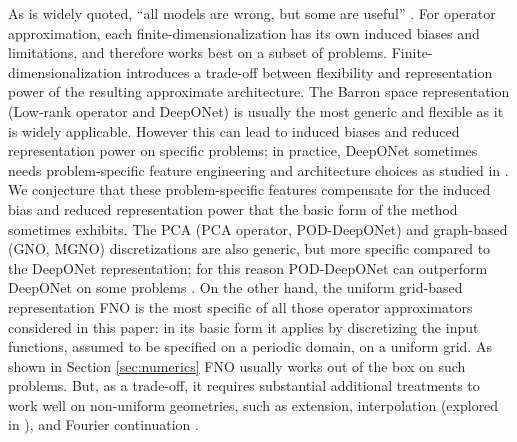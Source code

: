 As is widely quoted, ``all models are wrong, but some are useful'' \cite{box1976science}.
For operator approximation, 
each finite-dimensionalization has its own induced biases and limitations,
and therefore works best on a subset of problems. Finite-dimensionalization introduces a trade-off between flexibility and representation power of the resulting approximate architecture.
The Barron space representation (Low-rank operator and DeepONet) is usually the most generic and flexible as it is widely applicable. However this can lead to induced biases and reduced representation power on specific problems; in practice, DeepONet sometimes needs problem-specific feature engineering and architecture choices as studied in \cite{lu2021comprehensive}. We conjecture that these problem-specific features compensate
for the induced bias and reduced representation power that the basic form of the
method \citep{lu2019deeponet} sometimes exhibits.
The PCA (PCA operator, POD-DeepONet) and graph-based (GNO, MGNO) discretizations are also generic, but more specific compared to the DeepONet representation; for this reason
POD-DeepONet can outperform DeepONet on some problems \citep{lu2021comprehensive}.
On the other hand, the uniform grid-based representation FNO is the most specific of
all those operator approximators considered in this paper: in its basic form it
applies by discretizing the input functions, assumed to be specified on a periodic
domain, on a uniform grid. As shown in Section \ref{sec:numerics} FNO usually works
out of the box on such problems. But, as a trade-off, it requires substantial 
additional treatments to work well on non-uniform geometries, such as extension, interpolation (explored in
\cite{lu2021comprehensive}), and Fourier continuation \citep{bruno2007accurate}.



